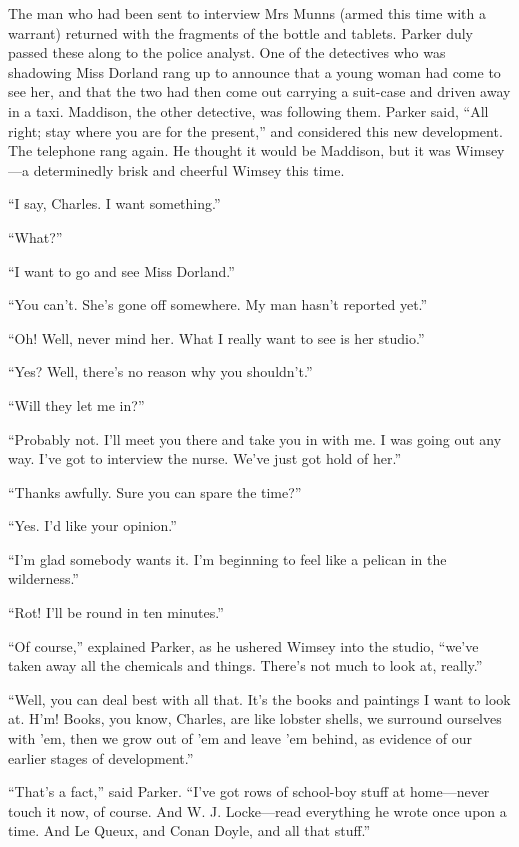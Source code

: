 The man who had been sent to interview Mrs Munns (armed this time with a warrant) returned with the fragments of the bottle and tablets. Parker duly passed these along to the police analyst. One of the detectives who was shadowing Miss Dorland rang up to announce that a young woman had come to see her, and that the two had then come out carrying a suit-case and driven away in a taxi. Maddison, the other detective, was following them. Parker said, \enquote{All right; stay where you are for the present,} and considered this new development. The telephone rang again. He thought it would be Maddison, but it was Wimsey\allowbreak---\allowbreak a determinedly brisk and cheerful Wimsey this time.

\enquote{I say, Charles. I want something.}

\enquote{What?}

\enquote{I want to go and see Miss Dorland.}

\enquote{You can't. She's gone off somewhere. My man hasn't reported yet.}

\enquote{Oh! Well, never mind her. What I really want to see is her studio.}

\enquote{Yes? Well, there's no reason why you shouldn't.}

\enquote{Will they let me in?}

\enquote{Probably not. I'll meet you there and take you in with me. I was going out any way. I've got to interview the nurse. We've just got hold of her.}

\enquote{Thanks awfully. Sure you can spare the time?}

\enquote{Yes. I'd like your opinion.}

\enquote{I'm glad somebody wants it. I'm beginning to feel like a pelican in the wilderness.}

\enquote{Rot! I'll be round in ten minutes.}

\enquote{Of course,} explained Parker, as he ushered Wimsey into the studio, \enquote{we've taken away all the chemicals and things. There's not much to look at, really.}

\enquote{Well, you can deal best with all that. It's the books and paintings I want to look at. H'm! Books, you know, Charles, are like lobster shells, we surround ourselves with 'em, then we grow out of 'em and leave 'em behind, as evidence of our earlier stages of development.}

\enquote{That's a fact,} said Parker. \enquote{I've got rows of school-boy stuff at home\allowbreak---\allowbreak never touch it now, of course. And W. J. Locke\allowbreak---\allowbreak read everything he wrote once upon a time. And Le Queux, and Conan Doyle, and all that stuff.}

